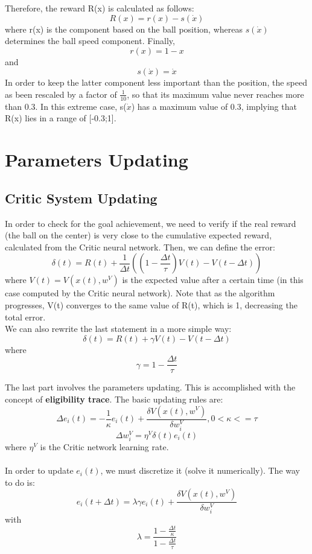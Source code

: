 \documentclass{article}
\begin{document}
Therefore, the reward R(x) is calculated as follows:
\[
R(x) = r(x) - s(\dot{x})
\]
where r(x) is the component based on the ball position, whereas \(s(\dot{x})\) determines the ball speed component. Finally,
\[
r(x) = 1 - x
\]
and
\[
s(\dot{x}) = \dot{x}
\]
In order to keep the latter component less important than the position, the speed as been rescaled by a factor of \(\frac{1}{10}\), so that its maximum value never reaches more than 0.3. In this extreme case, s(\(\dot{x}\)) has a maximum value of 0.3, implying that R(x) lies in a range of [-0.3;1].


\section{Parameters Updating}

\subsection{Critic System Updating}
In order to check for the goal achievement, we need to verify if the real reward (the ball on the center) is very close to the cumulative expected reward, calculated from the Critic neural network. Then, we can define the error:
\[
\delta(t) = R(t) + \frac{1}{\Delta t}((1 - \frac{\Delta t}{\tau})V(t) - V(t - \Delta t))
\]
where \(V(t)=V(x(t), w^{V})\) is the expected value after a certain time (in this case computed by the Critic neural network). Note that as the algorithm progresses, V(t) converges to the same value of R(t), which is 1, decreasing the total error.\\
We can also rewrite the last statement in a more simple way:
\[
\delta(t) = R(t) + \gamma V(t) - V(t - \Delta t)
\]
where
\[
\gamma = 1 - \frac{\Delta t}{\tau}
\]

The last part involves the parameters updating. This is accomplished with the concept of \textbf{eligibility trace}. The basic updating rules are:
\[
\Delta e_{i}(t) = -\frac{1}{\kappa}e_{i}(t) + \frac{\delta V(x(t), w^{V})}{\delta w_{i}^{V}}, 0 < \kappa <= \tau
\]
\[
\Delta w_{i}^{V} = \eta^{V} \delta (t)e_{i}(t)
\]
where \(\eta^{V}\) is the Critic network learning rate. \\ \\

In order to update \(e_{i}(t)\), we must discretize it (solve it numerically). The way to do is:
\[
e_{i}(t + \Delta t) = \lambda \gamma e_{i}(t) + \frac{\delta V(x(t), w^{V})}{\delta w_{i}^{V}}
\]
with
\[
\lambda = \frac{1 - \frac{\Delta t}{\kappa}}{1 - \frac{\Delta t}{\tau}}
\]
\end{document}

